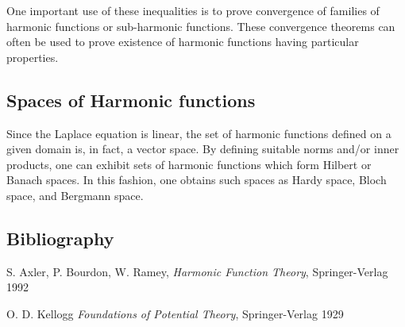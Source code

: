 \documentclass[12pt]{article}
\begin{document}
One important use of these inequalities is to prove convergence of families of harmonic functions or sub-harmonic functions.  These convergence theorems can often be used to prove existence of harmonic functions having particular properties.

\subsection{Spaces of Harmonic functions}

Since the Laplace equation is linear, the set of harmonic functions defined on a given domain is, in fact, a vector space.  By defining suitable norms and/or inner products, one can exhibit sets of harmonic functions which form Hilbert or Banach spaces.  In this fashion, one obtains such spaces as Hardy space, Bloch space, and Bergmann space.

\subsection{Bibliography}

S. Axler, P. Bourdon, W. Ramey, \emph{Harmonic Function Theory}, Springer-Verlag 1992

O. D. Kellogg \emph{Foundations of Potential Theory}, Springer-Verlag 1929
\end{document}
